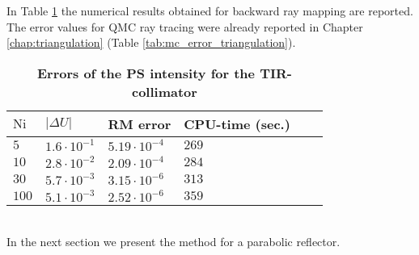 In Table \ref{tab:ray_mapping_tir} the numerical results obtained for backward ray mapping are reported. The error values for QMC ray tracing were already reported in Chapter \ref{chap:triangulation} (Table \ref{tab:mc_error_triangulation}).
\begin{table}[t] 
\centering
\caption{\bf Errors of the PS intensity for the TIR-collimator}
\begin{tabular}{llllll}
 \hline  $\textrm{Ni}$\; & $|\Delta U|$  & RM error & CPU-time (sec.)\\
  \hline 
 $5$    & $1.6\cdot 10^{-1}$   & $5.19\cdot10^{-4}$     & $269$  \\
$10$    & $2.8\cdot 10^{-2}$ & $2.09\cdot 10^{-4}$   & $284$   \\
$30$   & $5.7 \cdot 10^{-3}$ & $3.15\cdot 10^{-6}$   & $313$  \\
$100$  & $5.1 \cdot 10^{-3}$ & $2.52\cdot 10^{-6}$   & $359$  \\
 \hline
 \end{tabular}
 \label{tab:ray_mapping_tir}
 \end{table}
\\ \indent In the next section we present the method for a parabolic reflector.
